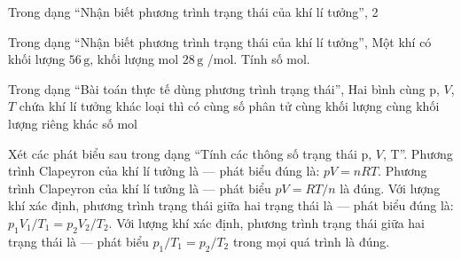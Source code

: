 \begin{bt}
Trong dạng “Nhận biết phương trình trạng thái của khí lí tưởng”, 2
\end{bt}

\begin{ex}
Trong dạng “Nhận biết phương trình trạng thái của khí lí tưởng”, Một khí có khối lượng $56\,\text{g}$, khối lượng mol $28\,\text{g}$ /mol. Tính số mol.
\end{ex}

\begin{ex}
Trong dạng “Bài toán thực tế dùng phương trình trạng thái”, Hai bình cùng p, $V$, $T$ chứa khí lí tưởng khác loại thì có
\choice
{\True cùng số phân tử}
{cùng khối lượng}
{cùng khối lượng riêng}
{khác số mol}
\end{ex}

\begin{ex}
Xét các phát biểu sau trong dạng “Tính các thông số trạng thái p, $V$, T”.
\choiceTF
{\True Phương trình Clapeyron của khí lí tưởng là — phát biểu đúng là: $pV=nRT$.}
{Phương trình Clapeyron của khí lí tưởng là — phát biểu $pV=RT/n$ là đúng.}
{\True Với lượng khí xác định, phương trình trạng thái giữa hai trạng thái là — phát biểu đúng là: $p_1V_1/T_1=p_2V_2/T_2$.}
{Với lượng khí xác định, phương trình trạng thái giữa hai trạng thái là — phát biểu $p_1/T_1=p_2/T_2$ trong mọi quá trình là đúng.}
\end{ex}

